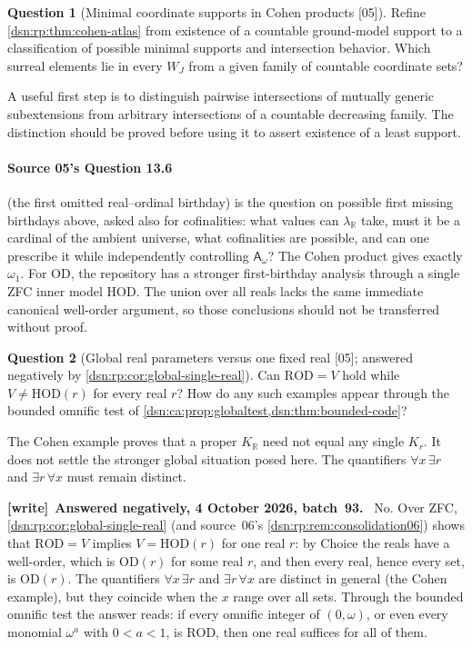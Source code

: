 \documentclass[11pt,a4paper]{article}
\numberwithin{equation}{section}
\theoremstyle{definition}
\newtheorem{question}[question]{Question}
\theoremstyle{remark}
\newcommand{\OD}{\mathrm{OD}}
\newcommand{\HOD}{\mathrm{HOD}}
\newcommand{\R}{\mathbb R}
\newcommand{\src}[1]{\textup{\textsf{\small[#1]}}}
\newenvironment{writenote}[1][]{\par\medskip\begingroup\small\noindent\textbf{[write]}\if\relax\detokenize{#1}\relax\else~\textbf{#1.}\fi~\ignorespaces}{\par\endgroup\medskip}
\newcommand{\ROD}{\mathrm{ROD}}
\newcommand{\KR}{K_{\R}}
\newcommand{\Asm}{\mathsf A_{\omega}}
\begin{document}
\begin{question}[Minimal coordinate supports in Cohen products \src{05}]
Refine \cref{dsn:rp:thm:cohen-atlas} from existence of a countable ground-model support
to a classification of possible minimal supports and intersection
behavior. Which surreal elements lie in every $W_J$ from a given
family of countable coordinate sets?
\end{question}
A useful first step is to distinguish pairwise intersections of
mutually generic subextensions from arbitrary intersections of a
countable decreasing family. The distinction should be proved before
using it to assert existence of a least support.

\paragraph{Source 05's Question 13.6} (the first omitted real--ordinal
birthday) is the question on possible first missing birthdays above, asked
also for cofinalities: what values can $\lambda_\R$ take, must it be a cardinal
of the ambient universe, what cofinalities are possible, and can one prescribe
it while independently controlling $\Asm$?
The Cohen product gives exactly $\omega_1$. For $\OD$, the repository
has a stronger first-birthday analysis through a single ZFC inner
model $\HOD$. The union over all reals lacks the same immediate
canonical well-order argument, so those conclusions should not be
transferred without proof.

\begin{question}[Global real parameters versus one fixed real \src{05}; answered negatively by \cref{dsn:rp:cor:global-single-real}]\label{dsn:ca:q:global}
Can $\ROD=V$ hold while $V\ne\HOD(r)$ for every real $r$? How do any
such examples appear through the bounded omnific test of
\cref{dsn:ca:prop:globaltest,dsn:thm:bounded-code}?
\end{question}
The Cohen example proves that a proper $\KR$ need not equal any
single $K_r$. It does not settle the stronger global situation posed
here. The quantifiers $\forall x\,\exists r$ and
$\exists r\,\forall x$ must remain distinct.
\begin{writenote}[Answered negatively, 4 October 2026, batch~93]
No. Over ZFC, \cref{dsn:rp:cor:global-single-real} (and source~06's
\cref{dsn:rp:rem:consolidation06}) shows that $\ROD=V$ implies $V=\HOD(r)$ for
one real $r$: by Choice the reals have a well-order, which is $\OD(r)$ for some
real $r$, and then every real, hence every set, is $\OD(r)$. The quantifiers
$\forall x\,\exists r$ and $\exists r\,\forall x$ are distinct in general
(the Cohen example), but they coincide when the $x$ range over all sets.
Through the bounded omnific test the answer reads: if every omnific integer
of $(0,\omega)$, or even every monomial $\omega^a$ with $0<a<1$, is $\ROD$,
then one real suffices for all of them.
\end{writenote}
\end{document}
